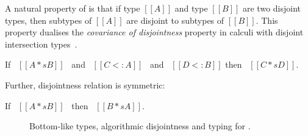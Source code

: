 \noindent A natural property of \name is
that if type $[[A]]$ and type $[[B]]$ are two disjoint types, then subtypes
of $[[A]]$ are disjoint to subtypes of $[[B]]$. This property dualises
the \emph{covariance of disjointness} property in calculi with disjoint
intersection types~\citep{alpuimdisjoint}.

\begin{lemma}
  If \ $[[A *s B]]$ \ and \ $[[C <: A]]$ \ and \ $[[D <: B]]$  then \ $[[C *s D]]$.
\label{lemma:union:disj-sub}
\end{lemma}


\noindent Further, disjointness relation is symmetric:

\begin{lemma}
  If \ $[[A *s B]]$ \ then \ $[[B *s A]]$.
\label{lemma:union:disj-sym}
\end{lemma}


\begin{figure}[t]
  \begin{small}
    \centering
  \end{small}
  \begin{small}
    \centering
  \end{small}
  \begin{small}
    \centering
  \end{small}
  \caption{Bottom-like types, algorithmic disjointness and typing for \name.}
  \label{fig:union:disj-typ}
\end{figure}



